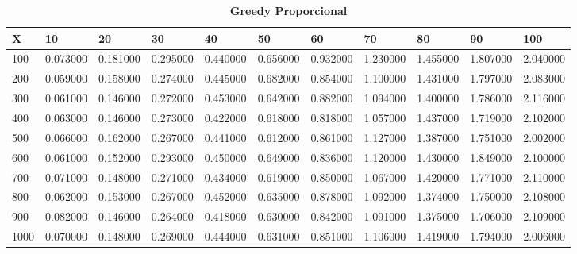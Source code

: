 \documentclass[10pt,letterpaper]{article}
\begin{document}
\newpage 
{}
\begin{center}
\begin{table}\renewcommand{\arraystretch}{2.5}
\caption{\large \textbf{Greedy Proporcional}}
\centering
\begin{tabular} { |m{0.5cm}|m{1.3cm}|m{1.3cm}|m{1.3cm}|m{1.3cm}|m{1.3cm}|m{1.3cm}|m{1.3cm}|m{1.3cm}|m{1.3cm}|m{1.3cm}|} 
\hline
\rowcolor{Gray}
\centering \textbf{X} & \centering \textbf{10} & \centering \textbf{20} & \centering \textbf{30}\ & \centering \textbf{40} & \centering \textbf{50} & \centering \textbf{60}\ & \centering \textbf{70} & \centering \textbf{80} & \centering \textbf{90}\ & \textbf{100} \\\hline
\cellcolor{Gray}100 & 0.073000 & 0.181000 & 0.295000 & 0.440000 & 0.656000 & 0.932000 & 1.230000 & 1.455000 & 1.807000 & 2.040000 \\
\hline
\cellcolor{Gray}200 & 0.059000 & 0.158000 & 0.274000 & 0.445000 & 0.682000 & 0.854000 & 1.100000 & 1.431000 & 1.797000 & 2.083000 \\
\hline
\cellcolor{Gray}300 & 0.061000 & 0.146000 & 0.272000 & 0.453000 & 0.642000 & 0.882000 & 1.094000 & 1.400000 & 1.786000 & 2.116000 \\
\hline
\cellcolor{Gray}400 & 0.063000 & 0.146000 & 0.273000 & 0.422000 & 0.618000 & 0.818000 & 1.057000 & 1.437000 & 1.719000 & 2.102000 \\
\hline
\cellcolor{Gray}500 & 0.066000 & 0.162000 & 0.267000 & 0.441000 & 0.612000 & 0.861000 & 1.127000 & 1.387000 & 1.751000 & 2.002000 \\
\hline
\cellcolor{Gray}600 & 0.061000 & 0.152000 & 0.293000 & 0.450000 & 0.649000 & 0.836000 & 1.120000 & 1.430000 & 1.849000 & 2.100000 \\
\hline
\cellcolor{Gray}700 & 0.071000 & 0.148000 & 0.271000 & 0.434000 & 0.619000 & 0.850000 & 1.067000 & 1.420000 & 1.771000 & 2.110000 \\
\hline
\cellcolor{Gray}800 & 0.062000 & 0.153000 & 0.267000 & 0.452000 & 0.635000 & 0.878000 & 1.092000 & 1.374000 & 1.750000 & 2.108000 \\
\hline
\cellcolor{Gray}900 & 0.082000 & 0.146000 & 0.264000 & 0.418000 & 0.630000 & 0.842000 & 1.091000 & 1.375000 & 1.706000 & 2.109000 \\
\hline
\cellcolor{Gray}1000 & 0.070000 & 0.148000 & 0.269000 & 0.444000 & 0.631000 & 0.851000 & 1.106000 & 1.419000 & 1.794000 & 2.006000 \\
\hline
\end{tabular} \\
\end{table}
\end{center}
\end{document}
